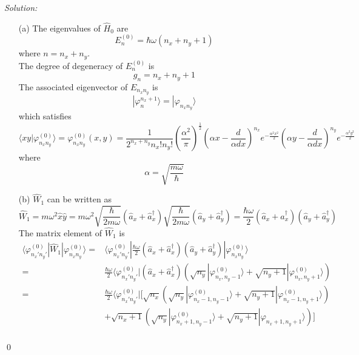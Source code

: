 \documentclass[10pt,a4paper]{article}
\newenvironment{sol}
    {\emph{Solution:}
    }
    {
    \qed
    }
\begin{document}
\begin{sol}
\begin{itemize}
\item[(a)] The eigenvalues of $\hat{H}_0$ are
\begin{equation}
E_n^{(0)}=\hbar\omega(n_x+n_y+1)
\end{equation}
where $n=n_x+n_y$.\\
The degree of degeneracy of $E_n^{(0)}$ is
\begin{equation}
g_n=n_x+n_y+1
\end{equation}
The associated eigenvector of $E_{n_xn_y}$ is
\begin{equation}
|\varphi_n^{n_x+1}\rangle=|\varphi_{n_xn_y}\rangle
\end{equation}
which satisfies
\begin{equation}
\langle xy|\varphi_{n_xn_y}^{(0)}\rangle=\varphi_{n_xn_y}^{(0)}(x,y)=\frac{1}{2^{n_x+n_y}n_x!n_y!}\left(\frac{\alpha^2}{\pi}\right)^{\frac{1}{2}}\left(\alpha x-\frac{d}{\alpha dx}\right)^{n_x}e^{-\frac{\alpha^2x^2}{2}}\left(\alpha y-\frac{d}{\alpha dx}\right)^{n_y}e^{-\frac{\alpha^2y^2}{2}}
\end{equation}
where
\begin{equation}
\alpha=\sqrt{\frac{m\omega}{\hbar}}
\end{equation}
\item[(b)] $\hat{W}_1$ can be written as
\begin{equation}
\hat{W}_1=m\omega^2\hat{x}\hat{y}=m\omega^2\sqrt{\frac{\hbar}{2m\omega}}(\hat{a}_x+\hat{a}_x^{\dagger})\sqrt{\frac{\hbar}{2m\omega}}(\hat{a}_y+\hat{a}_y^{\dagger})=\frac{\hbar\omega}{2}(\hat{a}_x+\hat{a}_x^{\dagger})(\hat{a}_y+\hat{a}_y^{\dagger})
\end{equation}
The matrix element of $\hat{W}_1$ is
\begin{align}
\nonumber\langle\varphi_{n_x'n_y'}^{(0)}|\hat{W}_1|\varphi_{n_xn_y}^{(0)}\rangle=&\langle\varphi_{n_x'n_y'}^{(0)}|\frac{\hbar\omega}{2}(\hat{a}_x+\hat{a}_x^{\dagger})(\hat{a}_y+\hat{a}_y^{\dagger})|\varphi_{n_xn_y}^{(0)}\rangle\\
\nonumber=&\frac{\hbar\omega}{2}\langle\varphi_{n_x'n_y'}^{(0)}|(\hat{a}_x+\hat{a}_x^{\dagger})(\sqrt{n_y}|\varphi_{n_x,n_y-1}^{(0)}\rangle+\sqrt{n_y+1}|\varphi_{n_x,n_y+1}^{(0)}\rangle)\\
\nonumber=&\frac{\hbar\omega}{2}\langle\varphi_{n_x'n_y'}^{(0)}|[\sqrt{n_x}(\sqrt{n_y}|\varphi_{n_x-1,n_y-1}^{(0)}\rangle+\sqrt{n_y+1}|\varphi_{n_x-1,n_y+1}^{(0)}\rangle)\\
\nonumber&+\sqrt{n_x+1}(\sqrt{n_y}|\varphi_{n_x+1,n_y-1}^{(0)}\rangle+\sqrt{n_y+1}|\varphi_{n_x+1,n_y+1}\rangle)]\\

\end{align}
\end{itemize}
\end{sol}
\end{document}
